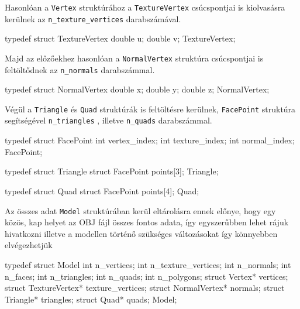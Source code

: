 Hasonlóan a \texttt{Vertex} struktúrához a \texttt{TextureVertex} csúcspontjai is kiolvasásra kerülnek az \texttt{n\_texture\_vertices} darabszámával.
\bigskip
\begin{python}
typedef struct TextureVertex
{
    double u;
    double v;
}TextureVertex;
\end{python}
\bigskip

Majd az előzőekhez hasonlóan a \texttt{NormalVertex}  struktúra csúcspontjai is feltöltődnek az \texttt{n\_normals} darabszámmal.
\bigskip
\begin{python}
typedef struct NormalVertex
{
    double x;
    double y;
    double z;
}NormalVertex;
\end{python}
\bigskip
\newpage
Végül a \texttt{Triangle} és \texttt{Quad} struktúrák is feltöltésre kerülnek, \texttt{FacePoint} struktúra segítségével \texttt{n\_triangles} , illetve \texttt{n\_quads} darabszámmal.
\bigskip
\begin{python}
typedef struct FacePoint
{
    int vertex_index;
    int texture_index;
    int normal_index;
} FacePoint;

typedef struct Triangle
{
    struct FacePoint points[3];
} Triangle;

typedef struct Quad
{
    struct FacePoint points[4];
} Quad;
\end{python}
\bigskip

Az összes adat  \texttt{Model} struktúrában kerül eltárolásra ennek előnye, hogy egy közös, kap helyet az OBJ fájl összes fontos adata, így egyszerűbben lehet rájuk hivatkozni illetve a modellen történő szükséges változásokat  így könnyebben elvégezhetjük
\bigskip
\begin{python}
typedef struct Model
{
    int n_vertices;
    int n_texture_vertices;
    int n_normals;
    int n_faces;
    int n_triangles;
    int n_quads;
    int n_polygons;
    struct Vertex* vertices;
    struct TextureVertex* texture_vertices;
    struct NormalVertex* normals;
    struct Triangle* triangles;
    struct Quad* quads;
}Model;
\end{python}
\newpage
{}


